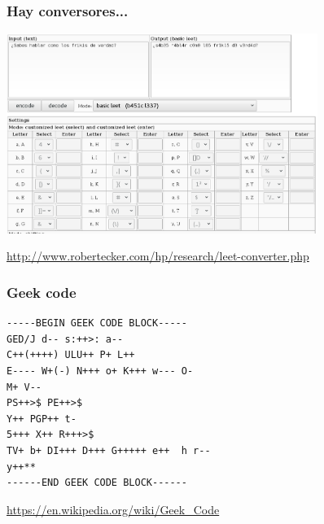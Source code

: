 \begin{frame}
\frametitle{Hay conversores...}

\begin{center}
\includegraphics[height=6.5cm]{figs/leetspeak-converter}
\end{center}

\begin{flushright}
  \url{http://www.robertecker.com/hp/research/leet-converter.php}
\end{flushright}

\end{frame}

\begin{frame}[fragile]
\frametitle{Geek code}

{\Large
\begin{verbatim}
-----BEGIN GEEK CODE BLOCK-----
GED/J d-- s:++>: a--
C++(++++) ULU++ P+ L++
E---- W+(-) N+++ o+ K+++ w--- O-
M+ V--
PS++>$ PE++>$
Y++ PGP++ t-
5+++ X++ R+++>$
TV+ b+ DI+++ D+++ G+++++ e++  h r--
y++**
------END GEEK CODE BLOCK------
\end{verbatim}
}

\begin{flushright}
  \url{https://en.wikipedia.org/wiki/Geek_Code}
\end{flushright}

\end{frame}






